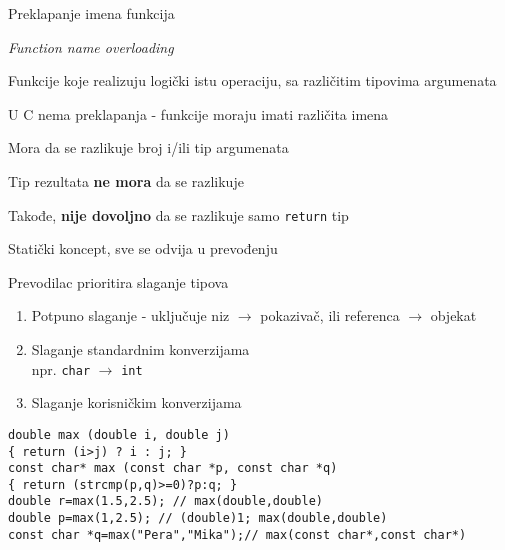 \documentclass{article}
\newenvironment{xitemize}{%
    
    \itemize
    \larger
}{%
    \enditemize
}
\let\olditemize\itemize
\let\endolditemize\enditemize
\renewenvironment{itemize}{%
    \smaller
    \olditemize
}{%
    \endolditemize
}
\providecommand{\inlinecode}[1]{\texttt{#1}}
\begin{document}
\begin{xitemize}
\item Preklapanje imena funkcija
\begin{itemize}
    \item \textit{Function name overloading}
    \item Funkcije koje realizuju logički istu operaciju, sa različitim tipovima argumenata
    \item U C nema preklapanja - funkcije moraju imati različita imena
    \item Mora da se razlikuje broj i/ili tip argumenata
    \item Tip rezultata \textbf{ne mora} da se razlikuje
    \item Takođe, \textbf{nije dovoljno} da se razlikuje samo \inlinecode{return} tip
    \item Statički koncept, sve se odvija u prevođenju
    \item Prevodilac prioritira slaganje tipova
    \begin{enumerate}
        \item Potpuno slaganje - uključuje niz $\rightarrow$ pokazivač, ili referenca $\rightarrow$ objekat
        \item Slaganje standardnim konverzijama\\
        npr. \inlinecode{char} $\rightarrow$ \inlinecode{int}
        \item Slaganje korisničkim konverzijama
    \end{enumerate}
    \begin{lstlisting}
double max (double i, double j)
{ return (i>j) ? i : j; }
const char* max (const char *p, const char *q)
{ return (strcmp(p,q)>=0)?p:q; }
double r=max(1.5,2.5); // max(double,double)
double p=max(1,2.5); // (double)1; max(double,double)
const char *q=max("Pera","Mika");// max(const char*,const char*)
    \end{lstlisting}
\end{itemize}


\end{xitemize}
\end{document}
